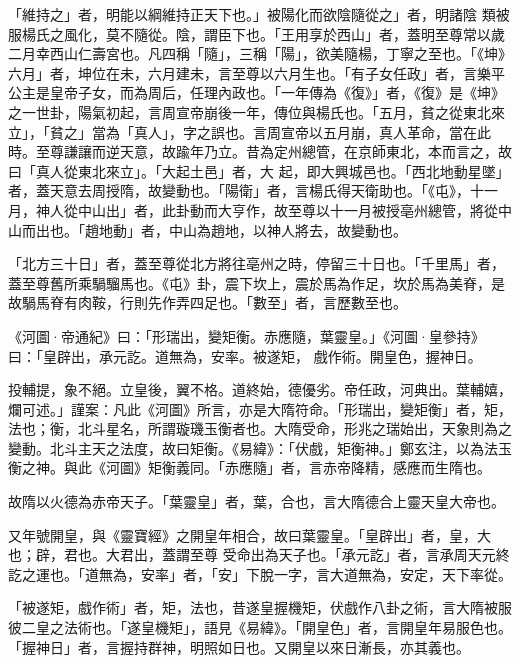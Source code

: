 \begin{pinyinscope}
 「維持之」者，明能以綱維持正天下也。」被陽化而欲陰隨從之」者，明諸陰
 類被服楊氏之風化，莫不隨從。陰，謂臣下也。「王用享於西山」者，蓋明至尊常以歲二月幸西山仁壽宮也。凡四稱「隨」，三稱「陽」，欲美隨楊，丁寧之至也。「《坤》六月」者，坤位在未，六月建未，言至尊以六月生也。「有子女任政」者，言樂平公主是皇帝子女，而為周后，任理內政也。「一年傳為《復》」者，《復》是《坤》之一世卦，陽氣初起，言周宣帝崩後一年，傳位與楊氏也。「五月，貧之從東北來立」，「貧之」當為「真人」，字之誤也。言周宣帝以五月崩，真人革命，當在此時。至尊謙讓而逆天意，故踰年乃立。昔為定州總管，在京師東北，本而言之，故曰「真人從東北來立」。「大起土邑」者，大
 起，即大興城邑也。「西北地動星墜」者，蓋天意去周授隋，故變動也。「陽衛」者，言楊氏得天衛助也。「《屯》，十一月，神人從中山出」者，此卦動而大亨作，故至尊以十一月被授亳州總管，將從中山而出也。「趙地動」者，中山為趙地，以神人將去，故變動也。



 「北方三十日」者，蓋至尊從北方將往亳州之時，停留三十日也。「千里馬」者，蓋至尊舊所乘騧騮馬也。《屯》卦，震下坎上，震於馬為作足，坎於馬為美脊，是故騧馬脊有肉鞍，行則先作弄四足也。「數至」者，言歷數至也。



 《河圖·帝通紀》曰：「形瑞出，變矩衡。赤應隨，葉靈皇。」《河圖·皇參持》曰：「皇辟出，承元訖。道無為，安率。被遂矩，
 戲作術。開皇色，握神日。



 投輔提，象不絕。立皇後，翼不格。道終始，德優劣。帝任政，河典出。葉輔嬉，爛可述。」謹案：凡此《河圖》所言，亦是大隋符命。「形瑞出，變矩衡」者，矩，法也；衡，北斗星名，所謂璇璣玉衡者也。大隋受命，形兆之瑞始出，天象則為之變動。北斗主天之法度，故曰矩衡。《易緯》：「伏戲，矩衡神。」鄭玄注，以為法玉衡之神。與此《河圖》矩衡義同。「赤應隨」者，言赤帝降精，感應而生隋也。



 故隋以火德為赤帝天子。「葉靈皇」者，葉，合也，言大隋德合上靈天皇大帝也。



 又年號開皇，與《靈寶經》之開皇年相合，故曰葉靈皇。「皇辟出」者，皇，大也；辟，君也。大君出，蓋謂至尊
 受命出為天子也。「承元訖」者，言承周天元終訖之運也。「道無為，安率」者，「安」下脫一字，言大道無為，安定，天下率從。



 「被遂矩，戲作術」者，矩，法也，昔遂皇握機矩，伏戲作八卦之術，言大隋被服彼二皇之法術也。「遂皇機矩」，語見《易緯》。「開皇色」者，言開皇年易服色也。「握神日」者，言握持群神，明照如日也。又開皇以來日漸長，亦其義也。




\end{pinyinscope}
